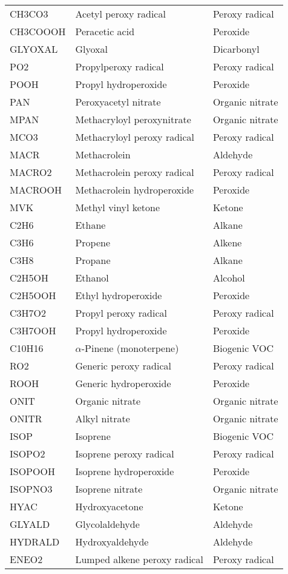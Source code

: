 \documentclass[12pt,a4paper]{article}
\begin{document}
\begin{longtable}{|p{3cm}|p{8cm}|p{3cm}|}
CH3CO3 & Acetyl peroxy radical & Peroxy radical \\
CH3COOOH & Peracetic acid & Peroxide \\
GLYOXAL & Glyoxal & Dicarbonyl \\
PO2 & Propylperoxy radical & Peroxy radical \\
POOH & Propyl hydroperoxide & Peroxide \\
PAN & Peroxyacetyl nitrate & Organic nitrate \\
MPAN & Methacryloyl peroxynitrate & Organic nitrate \\
MCO3 & Methacryloyl peroxy radical & Peroxy radical \\
MACR & Methacrolein & Aldehyde \\
MACRO2 & Methacrolein peroxy radical & Peroxy radical \\
MACROOH & Methacrolein hydroperoxide & Peroxide \\
MVK & Methyl vinyl ketone & Ketone \\
C2H6 & Ethane & Alkane \\
C3H6 & Propene & Alkene \\
C3H8 & Propane & Alkane \\
C2H5OH & Ethanol & Alcohol \\
C2H5OOH & Ethyl hydroperoxide & Peroxide \\
C3H7O2 & Propyl peroxy radical & Peroxy radical \\
C3H7OOH & Propyl hydroperoxide & Peroxide \\
C10H16 & $\alpha$-Pinene (monoterpene) & Biogenic VOC \\
RO2 & Generic peroxy radical & Peroxy radical \\
ROOH & Generic hydroperoxide & Peroxide \\
ONIT & Organic nitrate & Organic nitrate \\
ONITR & Alkyl nitrate & Organic nitrate \\
ISOP & Isoprene & Biogenic VOC \\
ISOPO2 & Isoprene peroxy radical & Peroxy radical \\
ISOPOOH & Isoprene hydroperoxide & Peroxide \\
ISOPNO3 & Isoprene nitrate & Organic nitrate \\
HYAC & Hydroxyacetone & Ketone \\
GLYALD & Glycolaldehyde & Aldehyde \\
HYDRALD & Hydroxyaldehyde & Aldehyde \\
ENEO2 & Lumped alkene peroxy radical & Peroxy radical \\

\end{longtable}
\end{document}
